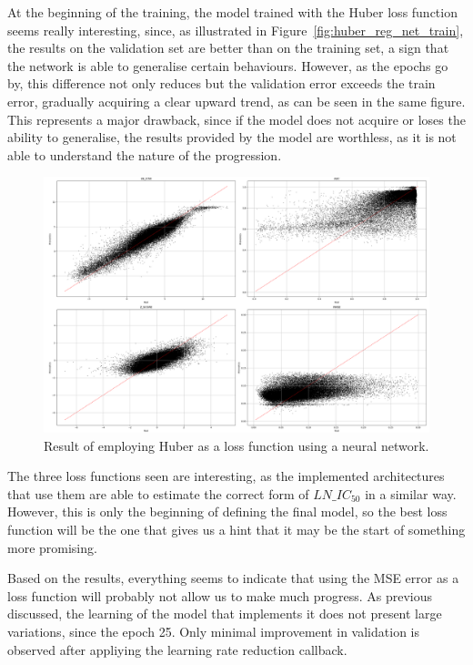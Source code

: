 At the beginning of the training, the model trained with the Huber loss function seems really interesting, since, as illustrated in Figure~\ref{fig:huber_reg_net_train}, the results on the validation set are better than on the training set, a sign that the network is able to generalise certain behaviours. However, as the epochs go by, this difference not only reduces but the validation error exceeds the train error, gradually acquiring a clear upward trend, as can be seen in the same figure. This represents a major drawback, since if the model does not acquire or loses the ability to generalise, the results provided by the model are worthless, as it is not able to understand the nature of the progression.

\begin{figure}[H]
    \centering
    \includegraphics[width=1\textwidth]{figures/neural_net_regression_research/output_neural_net_huber.png}
    \caption{Result of employing Huber as a loss function using a neural network.}
    \label{fig:huber_reg_net_result}
\end{figure}

The three loss functions seen are interesting, as the implemented architectures that use them are able to estimate the correct form of \(LN\_IC_{50}\) in a similar way. However, this is only the beginning of defining the final model, so the best loss function will be the one that gives us a hint that it may be the start of something more promising.

Based on the results, everything seems to indicate that using the MSE error as a loss function will probably not allow us to make much progress. As previous discussed, the learning of the model that implements it does not present large variations, since the epoch 25. Only minimal improvement in validation is observed after appliying the learning rate reduction callback. 

